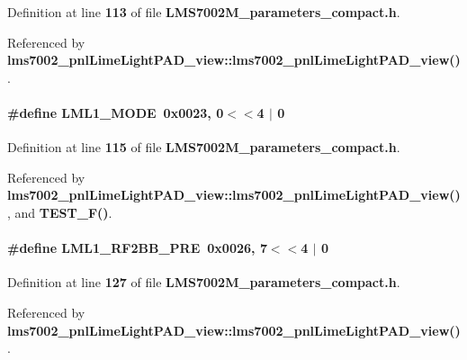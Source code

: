 Definition at line {\bf 113} of file {\bf L\+M\+S7002\+M\+\_\+parameters\+\_\+compact.\+h}.



Referenced by {\bf lms7002\+\_\+pnl\+Lime\+Light\+P\+A\+D\+\_\+view\+::lms7002\+\_\+pnl\+Lime\+Light\+P\+A\+D\+\_\+view()}.

\paragraph[{L\+M\+L1\+\_\+\+M\+O\+DE}]{\setlength{\rightskip}{0pt plus 5cm}\#define L\+M\+L1\+\_\+\+M\+O\+DE~0x0023, 0$<$$<$4 $\vert$  0}\label{LMS7002M__parameters__compact_8h_a8530f63cc25b8535ced7492f85493275}


Definition at line {\bf 115} of file {\bf L\+M\+S7002\+M\+\_\+parameters\+\_\+compact.\+h}.



Referenced by {\bf lms7002\+\_\+pnl\+Lime\+Light\+P\+A\+D\+\_\+view\+::lms7002\+\_\+pnl\+Lime\+Light\+P\+A\+D\+\_\+view()}, and {\bf T\+E\+S\+T\+\_\+\+F()}.

\paragraph[{L\+M\+L1\+\_\+\+R\+F2\+B\+B\+\_\+\+P\+RE}]{\setlength{\rightskip}{0pt plus 5cm}\#define L\+M\+L1\+\_\+\+R\+F2\+B\+B\+\_\+\+P\+RE~0x0026, 7$<$$<$4 $\vert$  0}\label{LMS7002M__parameters__compact_8h_ac7cc567a3f3abc528a0bc2dcbebb1582}


Definition at line {\bf 127} of file {\bf L\+M\+S7002\+M\+\_\+parameters\+\_\+compact.\+h}.



Referenced by {\bf lms7002\+\_\+pnl\+Lime\+Light\+P\+A\+D\+\_\+view\+::lms7002\+\_\+pnl\+Lime\+Light\+P\+A\+D\+\_\+view()}.


